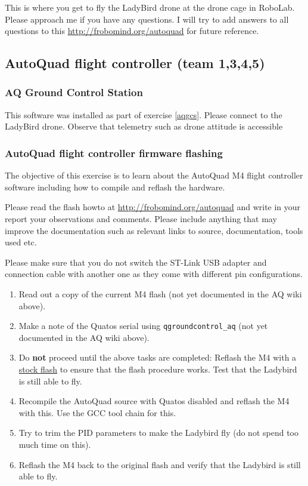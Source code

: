 \documentclass[a4paper,10pt,fleqn]{article}
\begin{document}
This is where you get to fly the LadyBird drone at the drone cage in RoboLab. Please approach me if you have any questions. I will try to add answers to all questions to this \href{http://frobomind.org/autoquad}{http://frobomind.org/autoquad} for future reference.


\subsection{AutoQuad flight controller (team 1,3,4,5)}

\subsubsection{AQ Ground Control Station}

This software was installed as part of exercise \ref{aqgcs}. Please connect to the LadyBird drone. Observe that telemetry such as drone attitude is accessible 


\subsubsection{AutoQuad flight controller firmware flashing}

The objective of this exercise is to learn about the AutoQuad M4 flight controller software including how to compile and reflash the hardware. 

Please read the flash howto at \href{http://frobomind.org/autoquad}{http://frobomind.org/autoquad} and write in your report your observations and comments. Please include anything that may improve the documentation such as relevant links to source, documentation, tools used etc.

Please make sure that you do not switch the ST-Link USB adapter and connection cable with another one as they come with different pin configurations.

\begin{enumerate}
\item Read out a copy of the current M4 flash (not yet documented in the AQ wiki above).
\item Make a note of the Quatos serial using \texttt{qgroundcontrol\_aq}   (not yet documented in the AQ wiki above).
\item Do \textbf{not} proceed until the above tasks are completed: Reflash the M4 with a \href{http://autoquad.org/software-downloads}{stock flash} to ensure that the flash procedure works. Test that the Ladybird is still able to fly.
\item Recompile the AutoQuad source with Quatos disabled and reflash the M4 with this. Use the GCC tool chain for this.
\item Try to trim the PID parameters to make the Ladybird fly (do not spend too much time on this).
\item Reflash the M4 back to the original flash and verify that the Ladybird is still able to fly.
\end{enumerate}
\end{document}

